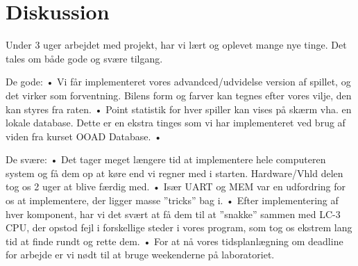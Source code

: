 \chapter{Diskussion}\label{cha:diskussion}
 
Under 3 uger arbejdet med projekt, har vi lært og oplevet mange nye tinge. Det tales om både gode og svære tilgang. 

De gode:
•	Vi får implementeret vores advandced/udvidelse version af spillet, og det virker som forventning. Bilens form og farver kan tegnes efter vores vilje, den kan styres fra raten.
•	Point statistik for hver spiller kan vises på skærm vha. en lokale database. Dette er en ekstra tinges som vi har implementeret ved brug af viden fra kurset OOAD Database.
•	


De svære:
•	Det tager meget længere tid at implementere hele computeren system og få dem op at køre end vi regner med i starten. Hardware/Vhld delen tog os 2 uger at blive færdig med. 
•	Især UART og MEM var en udfordring for os at implementere, der ligger masse ”tricks” bag i. 
•	Efter implementering af hver komponent, har vi det svært at få dem til at ”snakke” sammen med LC-3 CPU, der opstod fejl i forskellige steder i vores program, som tog os ekstrem lang tid at finde rundt og rette dem.
•	For at nå vores tidsplanlægning om deadline for arbejde er vi nødt til at bruge weekenderne på laboratoriet. 
